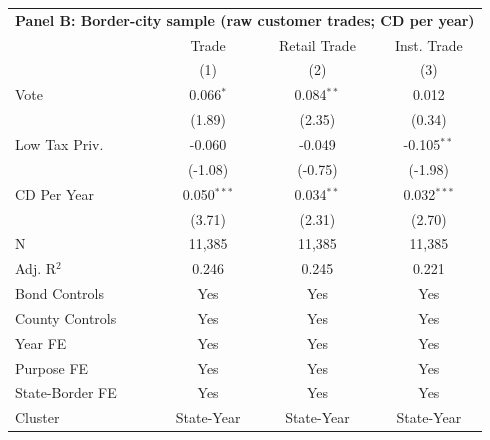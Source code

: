 \begingroup
\centering
\begin{tabular*}{\textwidth}{@{\extracolsep{\fill}}lccc}
\multicolumn{5}{l}{\textbf{Panel B: Border-city sample (raw customer trades; CD per year)}}\\

\addlinespace
   \toprule
                   & Trade         & Retail Trade & Inst. Trade\\  
                   & (1)           & (2)          & (3)\\  
   \midrule 
   Vote            & 0.066$^{*}$   & 0.084$^{**}$ & 0.012\\   
                   & (1.89)       & (2.35)      & (0.34)\\   
   Low Tax Priv.   & -0.060        & -0.049       & -0.105$^{**}$\\   
                   & (-1.08)      & (-0.75)     & (-1.98)\\   
   CD Per Year     & 0.050$^{***}$ & 0.034$^{**}$ & 0.032$^{***}$\\   
                   & (3.71)       & (2.31)      & (2.70)\\   
   \hline
   N    & 11,385        & 11,385       & 11,385\\  
   Adj. R$^2$  & 0.246         & 0.245        & 0.221\\  
   Bond Controls   & Yes           & Yes          & Yes\\  
   County Controls & Yes           & Yes          & Yes\\  
   Year FE         & Yes           & Yes          & Yes\\  
   Purpose FE      & Yes           & Yes          & Yes\\  
   State-Border FE & Yes           & Yes          & Yes\\  
   Cluster              & State-Year & State-Year & State-Year\\  
   \bottomrule
\end{tabular*}
\par\endgroup
